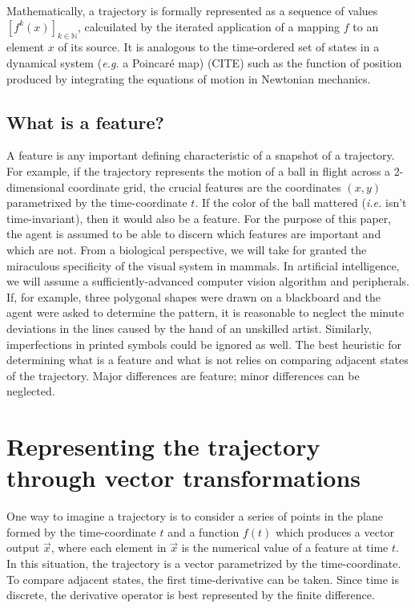 \documentclass{article}
\begin{document}
Mathematically, a trajectory is formally represented as a sequence of values $\left[ f^k(x) \right]_{k \in \mathbb{N}}$,
calcuilated by the iterated application of a mapping $f$ to an element $x$ of its source.
It is analogous to the time-ordered set of states in a dynamical system (\textit{e.g.} a Poincar\'e map) (CITE)
such as the function of position produced by integrating the equations of motion in Newtonian mechanics.

\subsection{What is a feature?}

A feature is any important defining characteristic of a snapshot of a trajectory.
For example, if the trajectory represents the motion of a ball in flight across a 2-dimensional coordinate grid,
the crucial features are the coordinates $(x, y)$ parametrixed by the time-coordinate $t$.
If the color of the ball mattered (\textit{i.e.} isn't time-invariant), then it would also be a feature.
For the purpose of this paper, the agent is assumed to be able to discern which features are important and which are not.
From a biological perspective, we will take for granted the miraculous specificity of the visual system in mammals.
In artificial intelligence, we will assume a sufficiently-advanced computer vision algorithm and peripherals.
If, for example, three polygonal shapes were drawn on a blackboard and the agent were asked to determine the pattern,
it is reasonable to neglect the minute deviations in the lines caused by the hand of an unskilled artist.
Similarly, imperfections in printed symbols could be ignored as well.
The best heuristic for determining what is a feature and what is not relies on comparing adjacent states of the trajectory.
Major differences are feature; minor differences can be neglected.

\section{Representing the trajectory through vector transformations}
\label{sec:vectorrepresentation}

One way to imagine a trajectory is to consider a series of points in the plane formed by the time-coordinate $t$
and a function $f(t)$ which produces a vector output $\vec{x}$,
where each element in $\vec{x}$ is the numerical value of a feature at time $t$.
In this situation, the trajectory is a vector parametrized by the time-coordinate.
To compare adjacent states, the first time-derivative can be taken.
Since time is discrete, the derivative operator is best represented by the finite difference.
\end{document}
